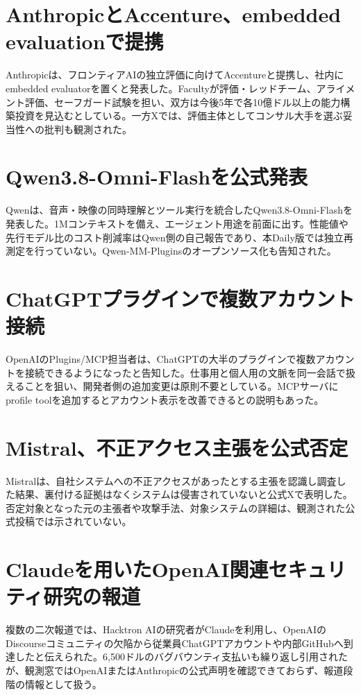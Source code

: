 \section{AnthropicとAccenture、embedded evaluationで提携}
Anthropicは、フロンティアAIの独立評価に向けてAccentureと提携し、社内にembedded evaluatorを置くと発表した。Facultyが評価・レッドチーム、アライメント評価、セーフガード試験を担い、双方は今後5年で各10億ドル以上の能力構築投資を見込むとしている。一方Xでは、評価主体としてコンサル大手を選ぶ妥当性への批判も観測された。

\section{Qwen3.8-Omni-Flashを公式発表}
Qwenは、音声・映像の同時理解とツール実行を統合したQwen3.8-Omni-Flashを発表した。1Mコンテキストを備え、エージェント用途を前面に出す。性能値や先行モデル比のコスト削減率はQwen側の自己報告であり、本Daily版では独立再測定を行っていない。Qwen-MM-Pluginsのオープンソース化も告知された。

\section{ChatGPTプラグインで複数アカウント接続}
OpenAIのPlugins/MCP担当者は、ChatGPTの大半のプラグインで複数アカウントを接続できるようになったと告知した。仕事用と個人用の文脈を同一会話で扱えることを狙い、開発者側の追加変更は原則不要としている。MCPサーバにprofile toolを追加するとアカウント表示を改善できるとの説明もあった。

\section{Mistral、不正アクセス主張を公式否定}
Mistralは、自社システムへの不正アクセスがあったとする主張を認識し調査した結果、裏付ける証拠はなくシステムは侵害されていないと公式Xで表明した。否定対象となった元の主張者や攻撃手法、対象システムの詳細は、観測された公式投稿では示されていない。

\section{Claudeを用いたOpenAI関連セキュリティ研究の報道}
複数の二次報道では、Hacktron AIの研究者がClaudeを利用し、OpenAIのDiscourseコミュニティの欠陥から従業員ChatGPTアカウントや内部GitHubへ到達したと伝えられた。6,500ドルのバグバウンティ支払いも繰り返し引用されたが、観測窓ではOpenAIまたはAnthropicの公式声明を確認できておらず、報道段階の情報として扱う。

